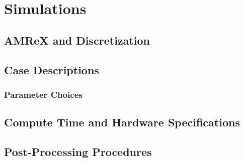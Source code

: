 \chapter{Simulations}

\section{AMReX and Discretization}
\section{Case Descriptions}
\subsection{Parameter Choices}
\section{Compute Time and Hardware Specifications}
\section{Post-Processing Procedures}




